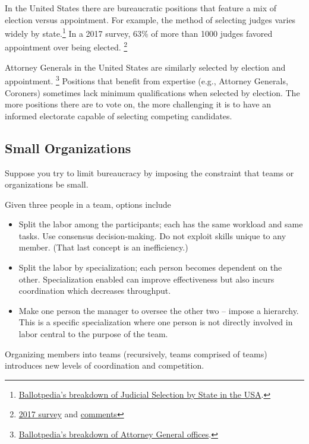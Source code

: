 In the United States there are bureaucratic positions that feature a mix of election versus appointment. For example, the method of selecting judges varies widely by state.\footnote{\href{https://ballotpedia.org/Judicial_selection_in_the_states}{Ballotpedia's breakdown of Judicial Selection by State in the USA}.} In a 2017 survey, 63\% of more than 1000 judges favored appointment over being elected. \footnote{\href{https://www.judges.org/news-and-info/the-age-old-question-should-judges-be-appointed-or-elected-heres-what-you-said/}{2017 survey} and \href{https://www.judges.org/wp-content/uploads/2020/03/Q1_Text.pdf}{comments}}

Attorney Generals in the United States are similarly  selected by election and appointment.
\footnote{\href{https://ballotpedia.org/Attorney_General_office_comparison}{Ballotpedia's breakdown of Attorney General offices}.}  Positions that benefit from expertise (e.g., Attorney Generals, Coroners) sometimes lack minimum qualifications when selected by election. The more positions there are to vote on, the more challenging it is to have an informed electorate capable of selecting competing candidates.

\subsection*{Small Organizations}

Suppose you try to limit bureaucracy by imposing the constraint that teams or organizations be small.

Given three people in a team, options include
\begin{itemize}
    \item Split the labor among the participants; each has the same workload and same tasks. Use consensus decision-making. Do not exploit skills unique to any member. (That last concept is an inefficiency.)
    \item Split the labor by specialization; each person becomes dependent on the other. Specialization enabled can improve effectiveness but also incurs coordination which decreases throughput.
    \item Make one person the manager to oversee the other two -- impose a hierarchy. This is a specific  specialization where one person is not directly involved in labor central to the purpose of the team.
\end{itemize}
Organizing members into teams (recursively, teams comprised of teams) introduces new levels of coordination and competition.

